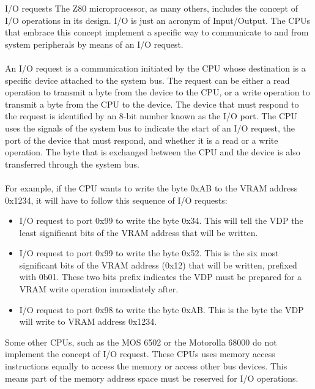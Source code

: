 \begin{theory}{I/O requests}
	The Z80 microprocessor, as many others, includes the concept of I/O operations in its design. I/O is just an acronym of Input/Output. The CPUs that embrace this concept implement a specific way to communicate to and from system peripherals by means of an I/O request.\\\\ 
	
	An I/O request is a communication initiated by the CPU whose destination is a specific device attached to the system bus. The request can be either a read operation to transmit a byte from the device to the CPU, or a write operation to transmit a byte from the CPU to the device. The device that must respond to the request is identified by an 8-bit number known as the I/O port. The CPU uses the signals of the system bus to indicate the start of an I/O request, the port of the device that must respond, and whether it is a read or a write operation. The byte that is exchanged between the CPU and the device is also transferred through the system bus. \\\\
	
	For example, if the CPU wants to write the byte 0xAB to the VRAM address 0x1234, it will have to follow this sequence of I/O requests:
	
	\begin{itemize}
		\item I/O request to port 0x99 to write the byte 0x34. This will tell the VDP the least significant bits of the VRAM address that will be written.
		\item I/O request to port 0x99 to write the byte 0x52. This is the six most significant bits of the VRAM address (0x12) that will be written, prefixed with 0b01. These two bits prefix indicates the VDP must be prepared for a VRAM write operation immediately after.
		\item I/O request to port 0x98 to write the byte 0xAB. This is the byte the VDP will write to VRAM address 0x1234.
	\end{itemize}
	
	Some other CPUs, such as the MOS 6502 or the Motorolla 68000 do not implement the concept of I/O request. These CPUs uses memory access instructions equally to access the memory or access other bus devices. This means part of the memory address space must be  reserved for I/O operations. 	
\end{theory}


